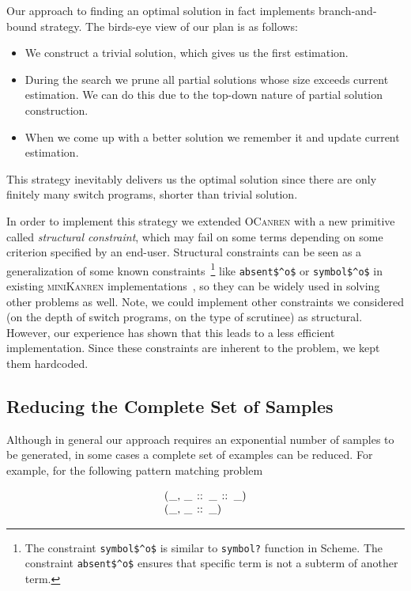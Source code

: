 Our approach to finding an optimal solution in fact implements branch-and-bound strategy. The birds-eye view of our plan is as follows:

\begin{itemize}
\item We construct a trivial solution, which gives us the first estimation.
\item During the search we prune all partial solutions whose size exceeds current estimation. We can do this due to
  the top-down nature of partial solution construction.
\item When we come up with a better solution we remember it and update current estimation.
\end{itemize}

\noindent This strategy inevitably delivers us the optimal solution since there are only finitely many switch programs, shorter than trivial solution.

In order to implement this strategy we extended \textsc{OCanren} with a new primitive called \emph{structural constraint}, which may
fail on some terms depending on some criterion specified by an end-user. Structural constraints can be seen as a generalization of
some known constraints~\footnote{The constraint  \lstinline|symbol$^o$| is similar to \lstinline{symbol?} function in Scheme. The constraint \lstinline|absent$^o$| ensures that specific term is not a subterm of another term.}
 like \lstinline|absent$^o$| or \lstinline|symbol$^o$|
in existing \textsc{miniKanren} implementations~\cite{Untagged}, 
so they can be widely used in solving other problems as well. Note, we could implement other constraints we considered (on the
depth of switch programs, on the type of scrutinee) as structural.
However, our experience has shown that this leads to
a less efficient implementation. Since these constraints are inherent to the problem, we kept them hardcoded.

\subsection{Reducing the Complete Set of Samples}
\label{sec:reduced-samples}

Although in general our approach requires an exponential number of samples to be generated, in some cases a complete set of examples can be reduced.
For example, for the following pattern matching problem

\[
\begin{array}{l}
\mbox{\lstinline|(_, _ :: _ :: _)|} \\
\mbox{\lstinline|(_, _ :: _)|}
\end{array}
\]

